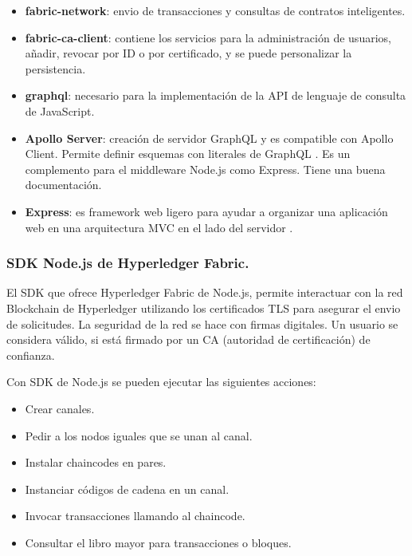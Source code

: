 \begin{itemize}
    \item \textbf{fabric-network}: envio de transacciones y consultas de contratos inteligentes.
    \item \textbf{fabric-ca-client}: contiene los servicios para la administración de usuarios, añadir, revocar por ID
    o por certificado, y se puede personalizar la persistencia.
    \item \textbf{graphql}: necesario para la implementación de la API de lenguaje de consulta de JavaScript. 
    \item \textbf{Apollo Server}: creación de servidor GraphQL y es compatible con Apollo Client. Permite definir 
    esquemas con literales de GraphQL \cite{introduction-apollo-server}. Es un complemento para el middleware Node.js 
    como Express. Tiene una buena documentación.
    \item \textbf{Express}: es framework web ligero para ayudar a organizar una aplicación web en una arquitectura MVC 
    en el lado del servidor \cite{what-is-express.js}.
\end{itemize}

\subsubsection*{SDK Node.js de Hyperledger Fabric.}

\noindent El SDK que ofrece Hyperledger Fabric de Node.js, permite interactuar con la red Blockchain de Hyperledger
utilizando los certificados TLS para asegurar el envio de solicitudes. La seguridad de la red se hace con firmas
digitales. Un usuario se considera válido, si está firmado por un CA (autoridad de certificación) de confianza.

\vspace{5mm}

\noindent Con SDK de Node.js se pueden ejecutar las siguientes acciones:

\begin{itemize}
    \item Crear canales.
    \item Pedir a los nodos iguales que se unan al canal.
    \item Instalar chaincodes en pares.
    \item Instanciar códigos de cadena en un canal.
    \item Invocar transacciones llamando al chaincode.
    \item Consultar el libro mayor para transacciones o bloques.
\end{itemize}

